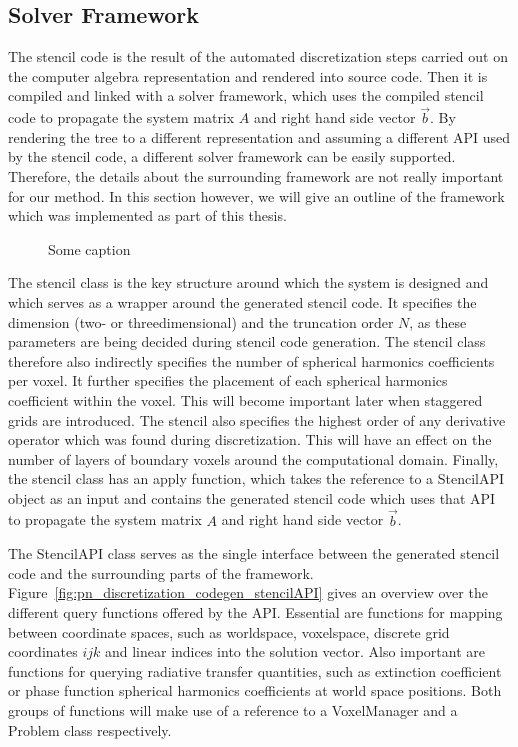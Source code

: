 \subsection{Solver Framework}
\label{sec:pn_framework}

The stencil code is the result of the automated discretization steps carried out on the computer algebra representation and rendered into source code. Then it is compiled and linked with a solver framework, which uses the compiled stencil code to propagate the system matrix $A$ and right hand side vector $\vec{b}$. By rendering the tree to a different representation and assuming a different API used by the stencil code, a different solver framework can be easily supported.
Therefore, the details about the surrounding framework are not really important for our method. In this section however, we will give an outline of the framework which was implemented as part of this thesis.
\begin{figure}[h]
\centering
{}
\caption{Some caption}
\label{fig:pn_classes}
\end{figure}

The stencil class is the key structure around which the system is designed and which serves as a wrapper around the generated stencil code. It specifies the dimension (two- or threedimensional) and the truncation order $N$, as these parameters are being decided during stencil code generation. The stencil class therefore also indirectly specifies the number of spherical harmonics coefficients per voxel. It further specifies the placement of each spherical harmonics coefficient within the voxel. This will become important later when staggered grids are introduced. The stencil also specifies the highest order of any derivative operator which was found during discretization. This will have an effect on the number of layers of boundary voxels around the computational domain. Finally, the stencil class has an apply function, which takes the reference to a StencilAPI object as an input and contains the generated stencil code which uses that API to propagate the system matrix $A$ and right hand side vector $\vec{b}$.

The StencilAPI class serves as the single interface between the generated stencil code and the surrounding parts of the framework. Figure~\ref{fig:pn_discretization_codegen_stencilAPI} gives an overview over the different query functions offered by the API. Essential are functions for mapping between coordinate spaces, such as worldspace, voxelspace, discrete grid coordinates $ijk$ and linear indices into the solution vector. Also important are functions for querying radiative transfer quantities, such as extinction coefficient or phase function spherical harmonics coefficients at world space positions. Both groups of functions will make use of a reference to a VoxelManager and a Problem class respectively.

